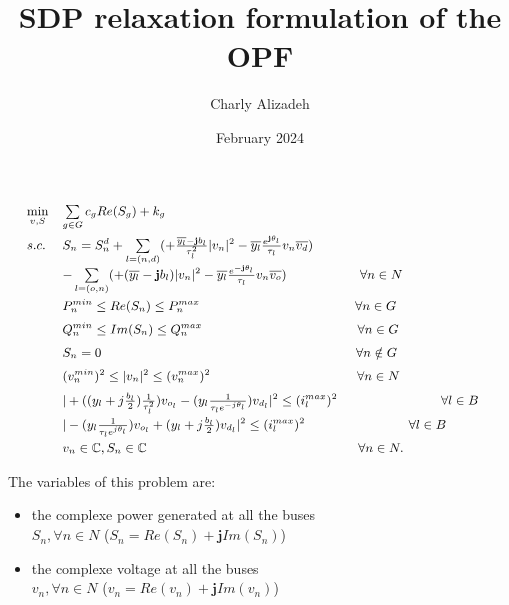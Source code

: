 \documentclass{article}
\title{SDP relaxation formulation of the OPF}
\author{Charly Alizadeh}
\date{February 2024}
\def \powerfromfirst {+\frac{\overline{y_l} - \mathbf{j}b_l}{\tau_l^2}}
\def \powerfromsecond {-\overline{y_l} \frac{e^{\mathbf{j}\theta_l}}{\tau_l}}
\def \powertofirst {+(\overline{y_l} - \mathbf{j}b_l)}
\def \powertosecond {-\overline{y_l} \frac{e^{-\mathbf{j}\theta_l}}{\tau_l }}
\def \currentfromfirst {+((y_l + j\frac{b_l}{2})\frac{1}{\tau_l^2})}
\def \currentfromsecond {-(y_l\frac{1}{\tau_l e^{-j\theta_l}})}
\def \currenttofirst {-(y_l\frac{1}{\tau_l e^{j\theta_l}})}
\def \currenttosecond {+(y_l + j\frac{b_l}{2})}
\begin{document}
\maketitle

\begin{equation}
\begin{small}
\begin{array}{lll}
\min\limits_{v, S} & \sum\limits_{g\in G}c_gRe(S_g)+k_g& \\[4mm]
s.c. & S_n = S_n^{d}%
+\sum\limits_{l=(n,d)}(\powerfromfirst{}{|v_n|^2} \powerfromsecond{}v_n\overline{v_d}) \\
& -\sum\limits_{l=(o,n)}(\powertofirst{}{|v_n|^2} \powertosecond{}v_n\overline{v_o}) ~~~~~~~~~~~~~~~~~ \forall n \in N\\[4mm]
& P_n^{min} \leq Re(S_n)\leq P_n^{max} ~~~~~~~~~~~~~~~~~~~~~~~~~~~~~~~~~~~~ \forall n \in G\\[2mm]
& Q_n^{min} \leq Im(S_n)\leq Q_n^{max} ~~~~~~~~~~~~~~~~~~~~~~~~~~~~~~~~~~~~  \forall n \in G\\[2mm]
& S_n=0  ~~~~~~~~~~~~~~~~~~~~~~~~~~~~~~~~~~~~~~~~~~~~~~~~~~~~~~~~~~~  \forall n \notin G\\[2mm]
& (v_n^{min})^2 \leq |v_n|^2 \leq (v_n^{max})^2 ~~~~~~~~~~~~~~~~~~~~~~~~~~~~~~~~~~ \forall n \in N \\[2mm]
& |\currentfromfirst{}{v_{o_l}} \currentfromsecond{}v_{d_l}|^2 \leq (i_l^{max})^2 ~~~~~~~~~~~~~~~~~~~~~~~~ \forall l \in B\\[2mm]
& |\currenttofirst{}{v_{o_l}} \currenttosecond{}v_{d_l}|^2 \leq (i_l^{max})^2 ~~~~~~~~~~~~~~~~~~~~~~~~ \forall l \in B\\[2mm]
& v_n \in \mathbb{C}, S_n \in \mathbb{C} ~~~~~~~~~~~~~~~~~~~~~~~~~~~~~~~~~~~~~~~~~~~~~~~~~ \forall n \in N.
\end{array}
\end{small}
\label{OPF}
\end{equation}

The variables of this problem are:
\begin{itemize}
    \item the complexe power generated at all the buses\\\(S_n, \forall n \in N\) (\(S_n = Re(S_n) + \mathbf{j}Im(S_n)\))
    \item the complexe voltage at all the buses\\\(v_n, \forall n \in N\) (\(v_n = Re(v_n) + \mathbf{j}Im(v_n)\))
\end{itemize}
\end{document}
